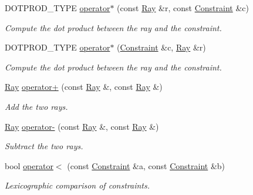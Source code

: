 \begin{DoxyCompactItemize}
D\+O\+T\+P\+R\+O\+D\+\_\+\+T\+Y\+PE \hyperlink{group___c_l_s_solvers_gaea75db1559315f35242d62e9e5f66e92}{operator$\ast$} (const \hyperlink{group___c_l_s_solvers_class_l_p___solvers_1_1_ray}{Ray} \&r, const \hyperlink{group___c_l_s_solvers_class_l_p___solvers_1_1_constraint}{Constraint} \&c)
\begin{DoxyCompactList}\small\item\em Compute the dot product between the ray and the constraint. \end{DoxyCompactList}\item 
D\+O\+T\+P\+R\+O\+D\+\_\+\+T\+Y\+PE \hyperlink{group___c_l_s_solvers_gaf9f83e5d45bfc080fbffde26ebb93892}{operator$\ast$} (\hyperlink{group___c_l_s_solvers_class_l_p___solvers_1_1_constraint}{Constraint} \&c, \hyperlink{group___c_l_s_solvers_class_l_p___solvers_1_1_ray}{Ray} \&r)
\begin{DoxyCompactList}\small\item\em Compute the dot product between the ray and the constraint. \end{DoxyCompactList}\item 
\hyperlink{group___c_l_s_solvers_class_l_p___solvers_1_1_ray}{Ray} \hyperlink{group___c_l_s_solvers_gaf293c6d803dc697897463525aa1d1d44}{operator+} (const \hyperlink{group___c_l_s_solvers_class_l_p___solvers_1_1_ray}{Ray} \&, const \hyperlink{group___c_l_s_solvers_class_l_p___solvers_1_1_ray}{Ray} \&)
\begin{DoxyCompactList}\small\item\em Add the two rays. \end{DoxyCompactList}\item 
\hyperlink{group___c_l_s_solvers_class_l_p___solvers_1_1_ray}{Ray} \hyperlink{group___c_l_s_solvers_gac20f6443d37909c326bb31c0399ea634}{operator-\/} (const \hyperlink{group___c_l_s_solvers_class_l_p___solvers_1_1_ray}{Ray} \&, const \hyperlink{group___c_l_s_solvers_class_l_p___solvers_1_1_ray}{Ray} \&)
\begin{DoxyCompactList}\small\item\em Subtract the two rays. \end{DoxyCompactList}\item 
bool \hyperlink{namespace_l_p___solvers_a28f6cde3df8ed19a4195584ace43c9d9}{operator$<$} (const \hyperlink{group___c_l_s_solvers_class_l_p___solvers_1_1_constraint}{Constraint} \&a, const \hyperlink{group___c_l_s_solvers_class_l_p___solvers_1_1_constraint}{Constraint} \&b)
\begin{DoxyCompactList}\small\item\em Lexicographic comparison of constraints. \end{DoxyCompactList}\item 

\end{DoxyCompactItemize}
